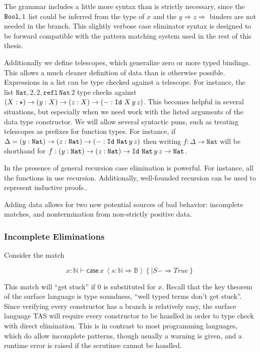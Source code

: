 The grammar includes a little more syntax than is strictly necessary, since the $\mathtt{Bool}{},1$ list could be inferred from the type of $x$ and the $y\Rightarrow z\Rightarrow$ binders are not needed in the branch.
This slightly verbose case eliminator syntax is designed to be forward compatible with the pattern matching system used in the rest of this thesis. 

Additionally we define telescopes, which generalize zero or more typed bindings.
This allows a much cleaner definition of data than is otherwise possible.
Expressions in a list can be type checked against a telescope. %
For instance, the list $\mathtt{Nat},2,2,\mathtt{refl}\,\mathtt{Nat}\,2$ type checks against $\left(X:\star\right)\rightarrow\left(y:X\right)\rightarrow\left(z:X\right)\rightarrow\left(-:\Id{}\ X\,y\,z\right)$.
This becomes helpful in several situations, but especially when we need work with the listed arguments of the data type constructor.
We will allow several syntactic puns, such as treating telescopes as prefixes for function types.
For instance, 
  if $\Delta=\left(y:\mathtt{Nat}\right)\rightarrow\left(z:\mathtt{Nat}\right)\rightarrow\left(-:\Id{}\ \mathtt{Nat}\,y\,z\right)$
  then writing $f:\Delta\rightarrow\mathtt{Nat}$
  will be shorthand for $f:\left(y:\mathtt{Nat}\right)\rightarrow\left(z:\mathtt{Nat}\right)\rightarrow \mathtt{Id}{}\ \mathtt{Nat}\,y\,z\rightarrow\mathtt{Nat}$.

In the presence of general recursion case elimination is powerful.
For instance, all the functions in  use recursion.
Additionally, well-founded recursion can be used to represent inductive proofs..

Adding data allows for two new potential sources of bad behavior: incomplete matches, and nontermination from non-strictly positive data. 

\subsubsection{Incomplete Eliminations}

Consider the match 

\[
x:\mathbb{N}\vdash\mathsf{case}\,x\,\left\langle s:\mathbb{N}\Rightarrow\mathbb{B}\right\rangle \left\{ |S-\Rightarrow True\right\} 
\]

This match will ``get stuck'' if $0$ is substituted for $x$.
Recall that the key theorem of the surface language is type soundness, ``well typed terms don't get stuck''.
Since verifying every constructor has a branch is relatively easy, the surface language \ac{TAS} will require every constructor to be handled in order to type check with direct elimination.
This is in contrast to most programming languages, which do allow incomplete patterns, though usually a warning is given, and a runtime error is raised if the scrutinee cannot be handled.

